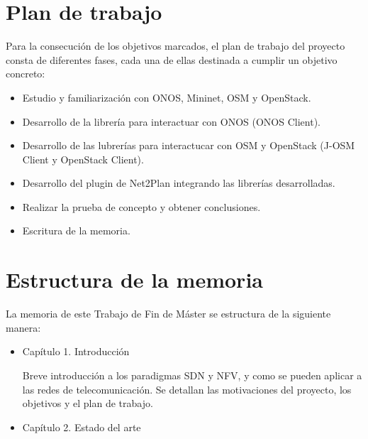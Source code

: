 \section{Plan de trabajo}

Para la consecución de los objetivos marcados, el plan de trabajo del proyecto consta de diferentes fases, cada una de ellas destinada a cumplir un objetivo concreto:

\begin{itemize}
	\item Estudio y familiarización con ONOS, Mininet, OSM y OpenStack.
	\item Desarrollo de la librería para interactuar con ONOS (ONOS Client).
	\item Desarrollo de las lubrerías para interactucar con OSM y OpenStack (J-OSM Client y OpenStack Client).
	\item Desarrollo del plugin de Net2Plan integrando las librerías desarrolladas.
	\item Realizar la prueba de concepto y obtener conclusiones.
	\item Escritura de la memoria.
\end{itemize}

\section{Estructura de la memoria}

La memoria de este Trabajo de Fin de Máster se estructura de la siguiente manera:
\begin{itemize}
	\item Capítulo 1. Introducción
	
	Breve introducción a los paradigmas SDN y NFV, y como se pueden aplicar a las redes de telecomunicación. Se detallan las motivaciones del proyecto, los objetivos y el plan de trabajo.
	
	\item Capítulo 2. Estado del arte
	
	
\end{itemize}
\cleardoublepage
	
